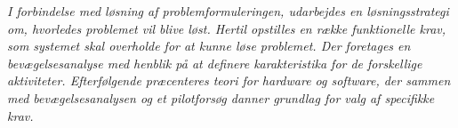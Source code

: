 \textit{I forbindelse med løsning af problemformuleringen, udarbejdes en løsningsstrategi om, hvorledes problemet vil blive løst. Hertil opstilles en række funktionelle krav, som systemet skal overholde for at kunne løse problemet. Der foretages en bevægelsesanalyse med henblik på at definere karakteristika for de forskellige aktiviteter. Efterfølgende præcenteres teori for hardware og software, der sammen med bevægelsesanalysen og et pilotforsøg danner grundlag for valg af specifikke krav.}


